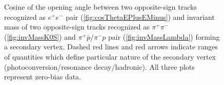 \begin{figure}[h]
{\begin{subfigure}[b]{\linewidth}{
                }
  \end{subfigure}
}
\quad
\parbox{0.31\textwidth}{
  \centering
  \begin{subfigure}[b]{\linewidth}{
                }
  \end{subfigure}
}
\caption[Cosine of the opening angle and invariant mass of two opposite-sign tracks forming a secondary vertex.]%
    {Cosine of the opening angle between two opposite-sign tracks recognized as $e^{+}e^{-}$ pair (\ref{fig:cosThetaEPlusEMinus}) and invariant mass of two opposite-sign tracks recognized as $\pi^{+}\pi^{-}$ (\ref{fig:invMassK0S}) and $\pi^{+}\bar{p}$/$\pi^{-}p$ pair (\ref{fig:invMassLambda}) forming a secondary vertex. Dashed red lines and red arrows indicate ranges of quantities which define particular nature of the secondary vertex (photoconversion/resonance decay/hadronic). All three plots represent zero-bias data.}\label{fig:secVtxTypeSelection}\vspace{-20pt}%
\end{figure}
   
